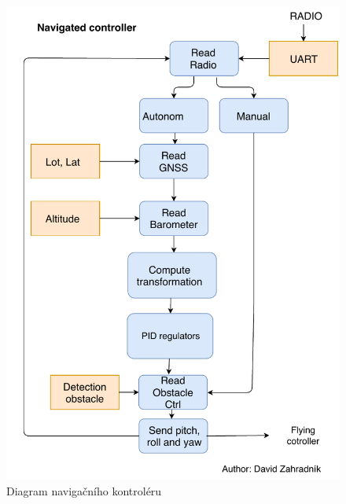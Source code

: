 \begin{figure}[H]
	\centering
	\includegraphics[width=14cm]{pictures/NaviDiagram.pdf}
	\caption{Diagram navigačního kontroléru}
\end{figure}

